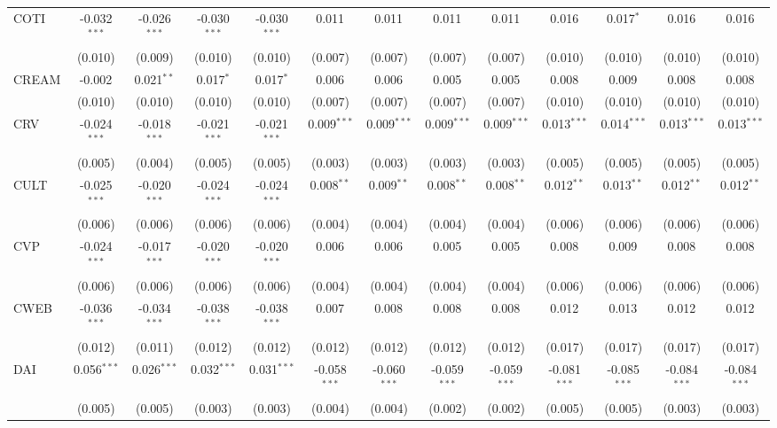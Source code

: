 \begin{table}[!htbp]
\begin{tabular}{@{\extracolsep{5pt}}lcccccccccccc}
 COTI & -0.032$^{***}$ & -0.026$^{***}$ & -0.030$^{***}$ & -0.030$^{***}$ & 0.011$^{}$ & 0.011$^{}$ & 0.011$^{}$ & 0.011$^{}$ & 0.016$^{}$ & 0.017$^{*}$ & 0.016$^{}$ & 0.016$^{}$ \\
  & (0.010) & (0.009) & (0.010) & (0.010) & (0.007) & (0.007) & (0.007) & (0.007) & (0.010) & (0.010) & (0.010) & (0.010) \\
 CREAM & -0.002$^{}$ & 0.021$^{**}$ & 0.017$^{*}$ & 0.017$^{*}$ & 0.006$^{}$ & 0.006$^{}$ & 0.005$^{}$ & 0.005$^{}$ & 0.008$^{}$ & 0.009$^{}$ & 0.008$^{}$ & 0.008$^{}$ \\
  & (0.010) & (0.010) & (0.010) & (0.010) & (0.007) & (0.007) & (0.007) & (0.007) & (0.010) & (0.010) & (0.010) & (0.010) \\
 CRV & -0.024$^{***}$ & -0.018$^{***}$ & -0.021$^{***}$ & -0.021$^{***}$ & 0.009$^{***}$ & 0.009$^{***}$ & 0.009$^{***}$ & 0.009$^{***}$ & 0.013$^{***}$ & 0.014$^{***}$ & 0.013$^{***}$ & 0.013$^{***}$ \\
  & (0.005) & (0.004) & (0.005) & (0.005) & (0.003) & (0.003) & (0.003) & (0.003) & (0.005) & (0.005) & (0.005) & (0.005) \\
 CULT & -0.025$^{***}$ & -0.020$^{***}$ & -0.024$^{***}$ & -0.024$^{***}$ & 0.008$^{**}$ & 0.009$^{**}$ & 0.008$^{**}$ & 0.008$^{**}$ & 0.012$^{**}$ & 0.013$^{**}$ & 0.012$^{**}$ & 0.012$^{**}$ \\
  & (0.006) & (0.006) & (0.006) & (0.006) & (0.004) & (0.004) & (0.004) & (0.004) & (0.006) & (0.006) & (0.006) & (0.006) \\
 CVP & -0.024$^{***}$ & -0.017$^{***}$ & -0.020$^{***}$ & -0.020$^{***}$ & 0.006$^{}$ & 0.006$^{}$ & 0.005$^{}$ & 0.005$^{}$ & 0.008$^{}$ & 0.009$^{}$ & 0.008$^{}$ & 0.008$^{}$ \\
  & (0.006) & (0.006) & (0.006) & (0.006) & (0.004) & (0.004) & (0.004) & (0.004) & (0.006) & (0.006) & (0.006) & (0.006) \\
 CWEB & -0.036$^{***}$ & -0.034$^{***}$ & -0.038$^{***}$ & -0.038$^{***}$ & 0.007$^{}$ & 0.008$^{}$ & 0.008$^{}$ & 0.008$^{}$ & 0.012$^{}$ & 0.013$^{}$ & 0.012$^{}$ & 0.012$^{}$ \\
  & (0.012) & (0.011) & (0.012) & (0.012) & (0.012) & (0.012) & (0.012) & (0.012) & (0.017) & (0.017) & (0.017) & (0.017) \\
 DAI & 0.056$^{***}$ & 0.026$^{***}$ & 0.032$^{***}$ & 0.031$^{***}$ & -0.058$^{***}$ & -0.060$^{***}$ & -0.059$^{***}$ & -0.059$^{***}$ & -0.081$^{***}$ & -0.085$^{***}$ & -0.084$^{***}$ & -0.084$^{***}$ \\
  & (0.005) & (0.005) & (0.003) & (0.003) & (0.004) & (0.004) & (0.002) & (0.002) & (0.005) & (0.005) & (0.003) & (0.003) \\

\end{tabular}
\end{table}
